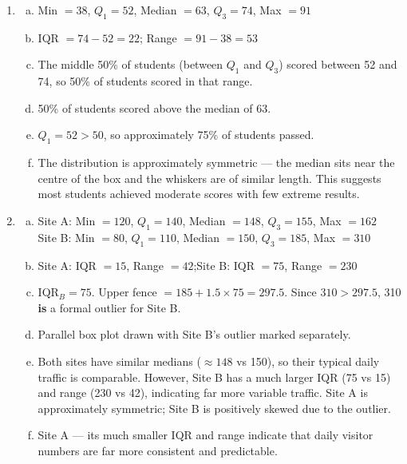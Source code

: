 \documentclass{article}
\begin{document}
\begin{enumerate}
  \item
  \begin{enumerate}[(a)]
    \item Min $= 38$, $Q_1 = 52$, Median $= 63$, $Q_3 = 74$, Max $= 91$
    \item IQR $= 74 - 52 = 22$; Range $= 91 - 38 = 53$
    \item The middle 50\% of students (between $Q_1$ and $Q_3$) scored between 52 and 74, so
    50\% of students scored in that range.
    \item 50\% of students scored above the median of 63.
    \item $Q_1 = 52 > 50$, so approximately 75\% of students passed.
    \item The distribution is approximately symmetric --- the median sits near the centre of
    the box and the whiskers are of similar length. This suggests most students achieved
    moderate scores with few extreme results.
  \end{enumerate}

  \item
  \begin{enumerate}[(a)]
    \item Site A: Min $= 120$, $Q_1 = 140$, Median $= 148$, $Q_3 = 155$, Max $= 162$\\
    Site B: Min $= 80$, $Q_1 = 110$, Median $= 150$, $Q_3 = 185$, Max $= 310$
    \item Site A: IQR $= 15$, Range $= 42$;\quad Site B: IQR $= 75$, Range $= 230$
    \item IQR$_B = 75$. Upper fence $= 185 + 1.5 \times 75 = 297.5$. Since $310 > 297.5$,
    310 \textbf{is} a formal outlier for Site B.
    \item Parallel box plot drawn with Site B's outlier marked separately.
    \item Both sites have similar medians ($\approx 148$ vs 150), so their typical daily traffic
    is comparable. However, Site B has a much larger IQR (75 vs 15) and range (230 vs 42),
    indicating far more variable traffic. Site A is approximately symmetric; Site B is
    positively skewed due to the outlier.
    \item Site A --- its much smaller IQR and range indicate that daily visitor numbers are
    far more consistent and predictable.
  \end{enumerate}


\end{enumerate}
\end{document}
